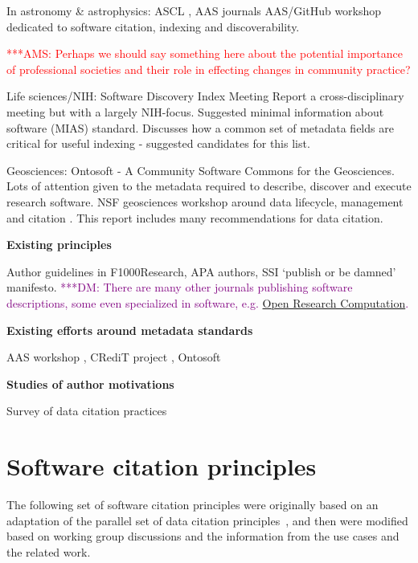 \documentclass[11pt, oneside]{amsart}
\newcommand{\asnote}[1]{ {\textcolor{red} { ***AMS: #1 }}}
\newcommand{\dmnote}[1]{ {\textcolor{purple} { ***DM: #1 }}} %
\begin{document}
In astronomy \& astrophysics: ASCL \cite{ascl}, AAS journals  AAS/GitHub
workshop \cite{aas-software-index} dedicated to software citation, indexing and discoverability.

\asnote{Perhaps we should say something here about the potential importance of professional societies and their role in effecting changes in community practice?}

Life sciences/NIH: Software Discovery Index Meeting Report \cite{software-discovery-index} a cross-disciplinary meeting
but with a largely NIH-focus. Suggested minimal information about software (MIAS) standard. Discusses how a common set of metadata
fields are critical for useful indexing - suggested candidates for this list.

Geosciences: Ontosoft \cite{ontosoft} - A Community Software Commons for the Geosciences. Lots of attention given to the metadata
required to describe, discover and execute research software. NSF geosciences workshop around data lifecycle, management and citation \cite{nsf-geo-data}. This report includes many recommendations for data citation.

\textbf{Existing principles}

Author guidelines in F1000Research, APA authors, SSI `publish or be damned' \cite{ssi-publish-or-be-damned} manifesto. \dmnote{There are many other journals publishing software descriptions, some even specialized in software, e.g. \href{http://www.openresearchcomputation.com}{Open Research Computation}.}

\textbf{Existing efforts around metadata standards}

AAS workshop \cite{aas-software-index}, CRediT project \cite{casrai-credit}, Ontosoft \cite{ontosoft}

\textbf{Studies of author motivations}

Survey of data citation practices \cite{Kratz_2015}

\section{Software citation principles}
\label{sec:principles}

The following set of software citation principles were originally based on an adaptation of the parallel set of data citation principles~\cite{data-citation-principles}, and then were modified based on working group discussions and the information from the use cases and the related work.
\end{document}
